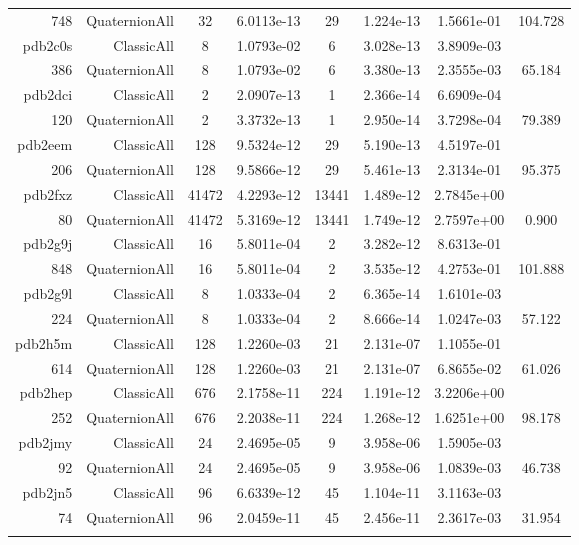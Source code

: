 \begin{xltabular}{\textwidth}{r|rcS[table-format=1.4e+2]cS[table-format=1.3e+2]S[table-format=1.4e+2]S[table-format=-1.3]}
748 & QuaternionAll & 32 & 6.0113e-13 & 29 & 1.224e-13 & 1.5661e-01 & 104.728\\  \addlinespace
pdb2c0s & ClassicAll & 8 & 1.0793e-02 & 6 & 3.028e-13 & 3.8909e-03 & \\
386 & QuaternionAll & 8 & 1.0793e-02 & 6 & 3.380e-13 & 2.3555e-03 & 65.184\\  \addlinespace
pdb2dci & ClassicAll & 2 & 2.0907e-13 & 1 & 2.366e-14 & 6.6909e-04 & \\
120 & QuaternionAll & 2 & 3.3732e-13 & 1 & 2.950e-14 & 3.7298e-04 & 79.389\\  \addlinespace
pdb2eem & ClassicAll & 128 & 9.5324e-12 & 29 & 5.190e-13 & 4.5197e-01 & \\
206 & QuaternionAll & 128 & 9.5866e-12 & 29 & 5.461e-13 & 2.3134e-01 & 95.375\\  \addlinespace
pdb2fxz & ClassicAll & 41472 & 4.2293e-12 & 13441 & 1.489e-12 & 2.7845e+00 & \\
80 & QuaternionAll & 41472 & 5.3169e-12 & 13441 & 1.749e-12 & 2.7597e+00 & 0.900\\  \addlinespace
pdb2g9j & ClassicAll & 16 & 5.8011e-04 & 2 & 3.282e-12 & 8.6313e-01 & \\
848 & QuaternionAll & 16 & 5.8011e-04 & 2 & 3.535e-12 & 4.2753e-01 & 101.888\\  \addlinespace
pdb2g9l & ClassicAll & 8 & 1.0333e-04 & 2 & 6.365e-14 & 1.6101e-03 & \\
224 & QuaternionAll & 8 & 1.0333e-04 & 2 & 8.666e-14 & 1.0247e-03 & 57.122\\  \addlinespace
pdb2h5m & ClassicAll & 128 & 1.2260e-03 & 21 & 2.131e-07 & 1.1055e-01 & \\
614 & QuaternionAll & 128 & 1.2260e-03 & 21 & 2.131e-07 & 6.8655e-02 & 61.026\\  \addlinespace
pdb2hep & ClassicAll & 676 & 2.1758e-11 & 224 & 1.191e-12 & 3.2206e+00 & \\
252 & QuaternionAll & 676 & 2.2038e-11 & 224 & 1.268e-12 & 1.6251e+00 & 98.178\\  \addlinespace
pdb2jmy & ClassicAll & 24 & 2.4695e-05 & 9 & 3.958e-06 & 1.5905e-03 & \\
92 & QuaternionAll & 24 & 2.4695e-05 & 9 & 3.958e-06 & 1.0839e-03 & 46.738\\  \addlinespace
pdb2jn5 & ClassicAll & 96 & 6.6339e-12 & 45 & 1.104e-11 & 3.1163e-03 & \\
74 & QuaternionAll & 96 & 2.0459e-11 & 45 & 2.456e-11 & 2.3617e-03 & 31.954\\  \addlinespace

\end{xltabular}
